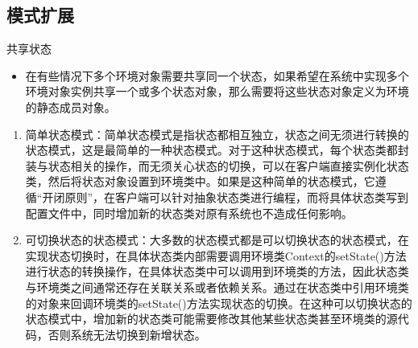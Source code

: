 \documentclass[letterpaper,10pt,english]{sphinxmanual}
\begin{document}
\subsection{模式扩展}
\label{\detokenize{behavioral_patterns/state:id14}}
\sphinxAtStartPar
共享状态
\begin{itemize}
\item {} 
\sphinxAtStartPar
在有些情况下多个环境对象需要共享同一个状态，如果希望在系统中实现多个环境对象实例共享一个或多个状态对象，那么需要将这些状态对象定义为环境的静态成员对象。

\end{itemize}
\begin{description}
\begin{enumerate}
%
\item {} 
\sphinxAtStartPar
简单状态模式：简单状态模式是指状态都相互独立，状态之间无须进行转换的状态模式，这是最简单的一种状态模式。对于这种状态模式，每个状态类都封装与状态相关的操作，而无须关心状态的切换，可以在客户端直接实例化状态类，然后将状态对象设置到环境类中。如果是这种简单的状态模式，它遵循“开闭原则”，在客户端可以针对抽象状态类进行编程，而将具体状态类写到配置文件中，同时增加新的状态类对原有系统也不造成任何影响。

\item {} 
\sphinxAtStartPar
可切换状态的状态模式：大多数的状态模式都是可以切换状态的状态模式，在实现状态切换时，在具体状态类内部需要调用环境类Context的setState()方法进行状态的转换操作，在具体状态类中可以调用到环境类的方法，因此状态类与环境类之间通常还存在关联关系或者依赖关系。通过在状态类中引用环境类的对象来回调环境类的setState()方法实现状态的切换。在这种可以切换状态的状态模式中，增加新的状态类可能需要修改其他某些状态类甚至环境类的源代码，否则系统无法切换到新增状态。

\end{enumerate}

\end{description}
\end{document}
